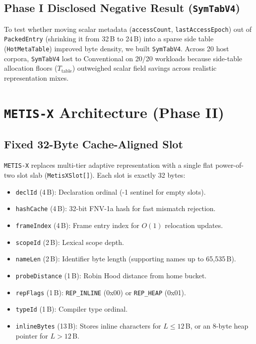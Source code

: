 \documentclass[conference]{IEEEtran}
\begin{document}
\subsection{Phase I Disclosed Negative Result (\texttt{SymTabV4})}
To test whether moving scalar metadata (\texttt{accessCount}, \texttt{lastAccessEpoch}) out of \texttt{PackedEntry} (shrinking it from 32\,B to 24\,B) into a sparse side table (\texttt{HotMetaTable}) improved byte density, we built \texttt{SymTabV4}. Across 20 host corpora, \texttt{SymTabV4} lost to Conventional on 20/20 workloads because side-table allocation floors ($T_{\text{table}}$) outweighed scalar field savings across realistic representation mixes.

\section{\texttt{METIS-X} Architecture (Phase II)}

\subsection{Fixed 32-Byte Cache-Aligned Slot}
\texttt{METIS-X} replaces multi-tier adaptive representation with a single flat power-of-two slot slab (\texttt{MetisXSlot[]}). Each slot is exactly 32 bytes:
\begin{itemize}
    \item \texttt{declId} (4\,B): Declaration ordinal (-1 sentinel for empty slots).
    \item \texttt{hashCache} (4\,B): 32-bit FNV-1a hash for fast mismatch rejection.
    \item \texttt{frameIndex} (4\,B): Frame entry index for $O(1)$ relocation updates.
    \item \texttt{scopeId} (2\,B): Lexical scope depth.
    \item \texttt{nameLen} (2\,B): Identifier byte length (supporting names up to 65,535\,B).
    \item \texttt{probeDistance} (1\,B): Robin Hood distance from home bucket.
    \item \texttt{repFlags} (1\,B): \texttt{REP\_INLINE} (0x00) or \texttt{REP\_HEAP} (0x01).
    \item \texttt{typeId} (1\,B): Compiler type ordinal.
    \item \texttt{inlineBytes} (13\,B): Stores inline characters for $L \le 12$\,B, or an 8-byte heap pointer for $L > 12$\,B.
\end{itemize}
\end{document}
